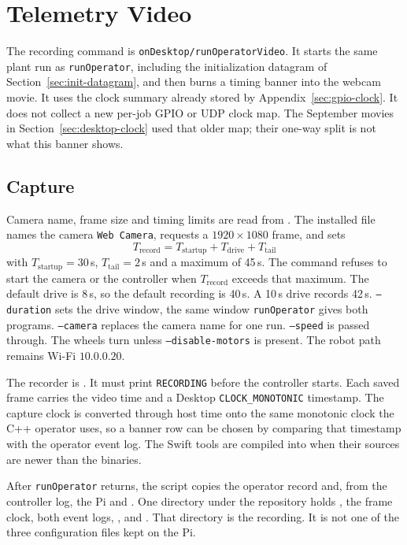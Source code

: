 \clearpage
\section{Telemetry Video}
\label{app:telemetry-video}

The recording command is \texttt{onDesktop/runOperatorVideo}. It starts the same plant run as \texttt{runOperator}, including the initialization datagram of Section~\ref{sec:init-datagram}, and then burns a timing banner into the webcam movie. It uses the clock summary already stored by Appendix~\ref{sec:gpio-clock}. It does not collect a new per-job GPIO or UDP clock map. The September movies in Section~\ref{sec:desktop-clock} used that older map; their one-way split is not what this banner shows.

\subsection{Capture}
Camera name, frame size and timing limits are read from . The installed file names the camera \texttt{Web Camera}, requests a \(1920\times1080\) frame, and sets
\[
T_{\mathrm{record}}=T_{\mathrm{startup}}+T_{\mathrm{drive}}+T_{\mathrm{tail}}
\]
with \(T_{\mathrm{startup}}=30\)\,s, \(T_{\mathrm{tail}}=2\)\,s and a maximum of 45\,s. The command refuses to start the camera or the controller when \(T_{\mathrm{record}}\) exceeds that maximum. The default drive is 8\,s, so the default recording is 40\,s. A 10\,s drive records 42\,s. \texttt{--duration} sets the drive window, the same window \texttt{runOperator} gives both programs. \texttt{--camera} replaces the camera name for one run. \texttt{--speed} is passed through. The wheels turn unless \texttt{--disable-motors} is present. The robot path remains Wi-Fi \(10.0.0.20\).

The recorder is . It must print \texttt{RECORDING} before the controller starts. Each saved frame carries the video time and a Desktop \texttt{CLOCK\_MONOTONIC} timestamp. The capture clock is converted through host time onto the same monotonic clock the C++ operator uses, so a banner row can be chosen by comparing that timestamp with the operator event log. The Swift tools are compiled into  when their sources are newer than the binaries.

After \texttt{runOperator} returns, the script copies the operator record and, from the controller log, the Pi  and . One directory under the repository  holds , the frame clock, both event logs, ,  and . That directory is the recording. It is not one of the three configuration files kept on the Pi.

